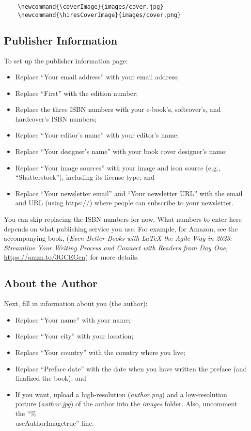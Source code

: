 \begin{lstlisting}
    \newcommand{\coverImage}{images/cover.jpg}
    \newcommand{\hiresCoverImage}{images/cover.png}
\end{lstlisting}



\subsection{Publisher Information}

To set up the publisher information page:

\begin{itemize}
\item Replace ``Your email address'' with your email address;
\item Replace ``First'' with the edition number;
\item Replace the three ISBN numbers with your e-book's, softcover's, and hardcover's ISBN numbers; 
\item Replace ``Your editor's name'' with your editor's name;
\item Replace ``Your designer's name'' with your book cover designer's name;
\item Replace ``Your image sources'' with your image and icon source (e.g., ``Shutterstock''), including its license type; and
\item Replace ``Your newsletter email'' and ``Your newsletter URL'' with the email and URL (using https://) where people can subscribe to your newsletter.
\end{itemize}

You can skip replacing the ISBN numbers for now. What numbers to enter here depends on what publishing service you use. For example, for Amazon, see the accompanying book, (\textit{Even Better Books with LaTeX the Agile Way in 2023: Streamline Your Writing Process and Connect with Readers from Day One}, \url{https://amzn.to/3GCEGen}) for more details.


\subsection{About the Author}

Next, fill in information about you (the author):

\begin{itemize}
    \item Replace ``Your name'' with your name;
    \item Replace ``Your city'' with your location;
    \item Replace ``Your country'' with the country where you live;
    \item Replace ``Preface date'' with the date when you have written the preface (and finalized the book); and
    \item If you want, upload a high-resolution (\textit{author.png}) and a low-resolution picture (\textit{author.jpg}) of the author into the \textit{images} folder. Also, uncomment the ``\%\\useAuthorImagetrue'' line.
\end{itemize}




